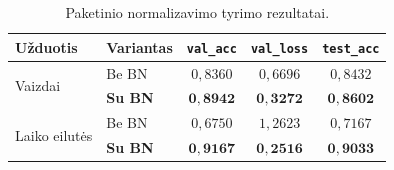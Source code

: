 \begin{table}[H]
    \centering
    \caption{Paketinio normalizavimo tyrimo rezultatai.}
    \begin{tabular}{|l|l|c|c|c|}
        \hline
        Užduotis & Variantas & \texttt{val\_acc} & \texttt{val\_loss} & \texttt{test\_acc} \\
        \hline
        \multirow{2}{*}{Vaizdai}
            & Be BN     & $0{,}8360$ & $0{,}6696$ & $0{,}8432$ \\ \cline{2-5}
            & \textbf{Su BN} & $\mathbf{0{,}8942}$ & $\mathbf{0{,}3272}$ & $\mathbf{0{,}8602}$ \\
        \hline
        \multirow{2}{*}{Laiko eilutės}
            & Be BN     & $0{,}6750$ & $1{,}2623$ & $0{,}7167$ \\ \cline{2-5}
            & \textbf{Su BN} & $\mathbf{0{,}9167}$ & $\mathbf{0{,}2516}$ & $\mathbf{0{,}9033}$ \\
        \hline
    \end{tabular}
    \label{tab:rez_batch_norm}
\end{table}
